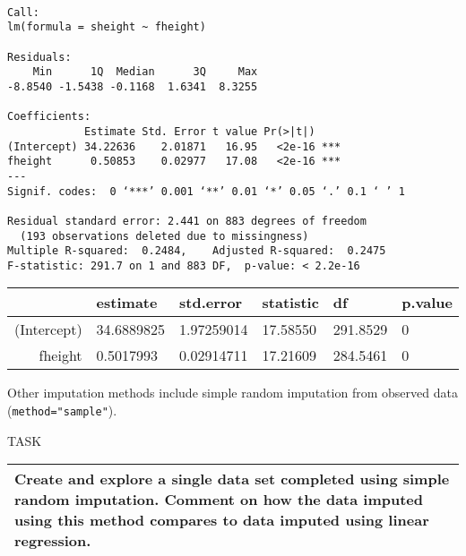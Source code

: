 \documentclass[11pt]{article}
\begin{document}
    
    
    \begin{verbatim}

Call:
lm(formula = sheight ~ fheight)

Residuals:
    Min      1Q  Median      3Q     Max 
-8.8540 -1.5438 -0.1168  1.6341  8.3255 

Coefficients:
            Estimate Std. Error t value Pr(>|t|)    
(Intercept) 34.22636    2.01871   16.95   <2e-16 ***
fheight      0.50853    0.02977   17.08   <2e-16 ***
---
Signif. codes:  0 ‘***’ 0.001 ‘**’ 0.01 ‘*’ 0.05 ‘.’ 0.1 ‘ ’ 1

Residual standard error: 2.441 on 883 degrees of freedom
  (193 observations deleted due to missingness)
Multiple R-squared:  0.2484,	Adjusted R-squared:  0.2475 
F-statistic: 291.7 on 1 and 883 DF,  p-value: < 2.2e-16

    \end{verbatim}

    
    \begin{tabular}{r|lllll}
  & estimate & std.error & statistic & df & p.value\\
\hline
	(Intercept) & 34.6889825 & 1.97259014 & 17.58550   & 291.8529   & 0         \\
	fheight &  0.5017993 & 0.02914711 & 17.21609   & 284.5461   & 0         \\
\end{tabular}


    
    Other imputation methods include simple random imputation from observed
data (\texttt{method="sample"}).

\textbar{}

TASK

\begin{longtable}[]{@{}l@{}}
\toprule
\begin{minipage}[t]{0.07\columnwidth}\raggedright\strut
Create and explore a single data set completed using simple random
imputation. Comment on how the data imputed using this method compares
to data imputed using linear regression.\strut
\end{minipage}\tabularnewline
\bottomrule
\end{longtable}
\end{document}
